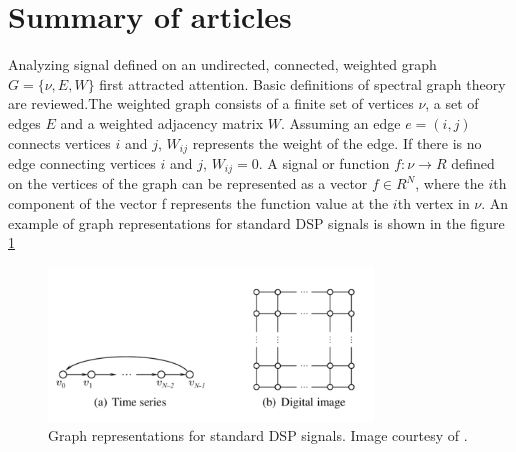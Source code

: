 \documentclass[conference]{IEEEtran}
\begin{document}
\section{Summary of articles}
Analyzing signal defined on an undirected, connected, weighted graph $G=\{\nu, E, W\}$ first attracted attention. Basic definitions of spectral graph theory are reviewed.The weighted graph consists of a finite set of vertices $\nu$, a set of edges $E$ and a weighted adjacency matrix $W$. Assuming an edge $e=(i,j)$ connects vertices $i$ and $j$, $W_{ij}$ represents the weight of the edge. If there is no edge connecting vertices $i$ and $j$, $W_{ij}=0$. A signal or function $f:\nu\to R$ defined on the vertices of the graph can be represented as a vector $f\in R^N$, where the $i$th component of the vector f represents the function value at the $i$th vertex in $\nu$. An example of graph representations for standard DSP signals is shown in the figure \ref{5}\\
\begin{figure}[htbp]
\centerline{\includegraphics[width=3.4in]{5.png}}
\caption{Graph representations for standard DSP signals. Image courtesy of \cite{b4}.}
\label{5}
\end{figure}
\end{document}
